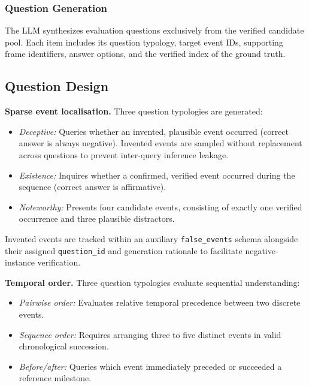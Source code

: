 \documentclass[journal]{IEEEtran}
\begin{document}
\subsubsection{Question Generation}
The LLM synthesizes evaluation questions exclusively from the verified candidate pool. Each item includes its question typology, target event IDs, supporting frame identifiers, answer options, and the verified index of the ground truth.

\subsection{Question Design}

\textbf{Sparse event localisation.} Three question typologies are generated:
\begin{itemize}
    \item \emph{Deceptive:} Queries whether an invented, plausible event occurred (correct answer is always negative). Invented events are sampled without replacement across questions to prevent inter-query inference leakage.
    \item \emph{Existence:} Inquires whether a confirmed, verified event occurred during the sequence (correct answer is affirmative).
    \item \emph{Noteworthy:} Presents four candidate events, consisting of exactly one verified occurrence and three plausible distractors.
\end{itemize}
Invented events are tracked within an auxiliary \texttt{false\_events} schema alongside their assigned \texttt{question\_id} and generation rationale to facilitate negative-instance verification.

\textbf{Temporal order.} Three question typologies evaluate sequential understanding:
\begin{itemize}
    \item \emph{Pairwise order:} Evaluates relative temporal precedence between two discrete events.
    \item \emph{Sequence order:} Requires arranging three to five distinct events in valid chronological succession.
    \item \emph{Before/after:} Queries which event immediately preceded or succeeded a reference milestone.
\end{itemize}
\end{document}

